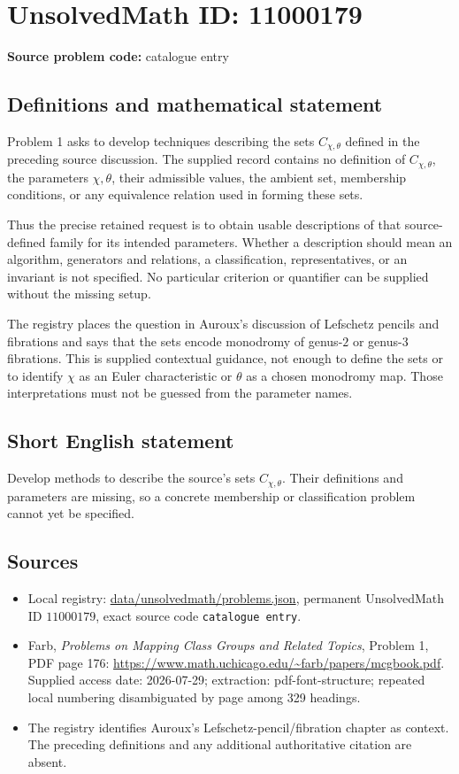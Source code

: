 \documentclass[11pt]{article}
\begin{document}
\section*{UnsolvedMath ID: 11000179}
\textbf{Source problem code:} catalogue entry
\subsection{Definitions and mathematical statement}
Problem 1 asks to develop techniques describing the sets $C_{\chi,\theta}$ defined in the preceding source discussion. The supplied record contains no definition of $C_{\chi,\theta}$, the parameters $\chi,\theta$, their admissible values, the ambient set, membership conditions, or any equivalence relation used in forming these sets.

Thus the precise retained request is to obtain usable descriptions of that source-defined family for its intended parameters. Whether a description should mean an algorithm, generators and relations, a classification, representatives, or an invariant is not specified. No particular criterion or quantifier can be supplied without the missing setup.

The registry places the question in Auroux's discussion of Lefschetz pencils and fibrations and says that the sets encode monodromy of genus-$2$ or genus-$3$ fibrations. This is supplied contextual guidance, not enough to define the sets or to identify $\chi$ as an Euler characteristic or $\theta$ as a chosen monodromy map. Those interpretations must not be guessed from the parameter names.
\subsection{Short English statement}
Develop methods to describe the source's sets $C_{\chi,\theta}$. Their definitions and parameters are missing, so a concrete membership or classification problem cannot yet be specified.
\subsection{Sources}
\begin{itemize}
\item Local registry: \url{data/unsolvedmath/problems.json}, permanent UnsolvedMath ID $11000179$, exact source code \texttt{catalogue entry}.
\item Farb, \emph{Problems on Mapping Class Groups and Related Topics}, Problem 1, PDF page 176: \url{https://www.math.uchicago.edu/~farb/papers/mcgbook.pdf}. Supplied access date: 2026-07-29; extraction: pdf-font-structure; repeated local numbering disambiguated by page among 329 headings.
\item The registry identifies Auroux's Lefschetz-pencil/fibration chapter as context. The preceding definitions and any additional authoritative citation are absent.
\end{itemize}
\end{document}
